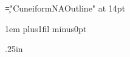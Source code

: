 \setmarginsbytypefield{9.6in}{4.75in} \advance{} \advance{}

\font\c="CuneiformNAOutline" at 14pt

\newdimen\tabletwidth \tabletwidth=4.25in \spaceskip1em plus1fil minus0pt

 \hfuzz.25in

\def\tabletruling{\penalty0 \hrule height.1pt width\tabletwidth 
  \nobreak\kern-6pt\nobreak}

\def\cuneifyLine#1#2{\tabletruling
  \leavevmode\llap{\hbox to.5in{\ten\rm#1\hfil}}%
  \vtop{
    \leftskip0pt plus1fil \hsize\tabletwidth \parfillskip0pt
    \leavevmode\hfilneg\c#2\endgraf
  }\endgraf\smallskip}

\def\cuneifySquare#1{{\fourteen\rm[}#1{\fourteen\rm]}}

\UBB\ten\rm

\noblackboxes

\endinput
